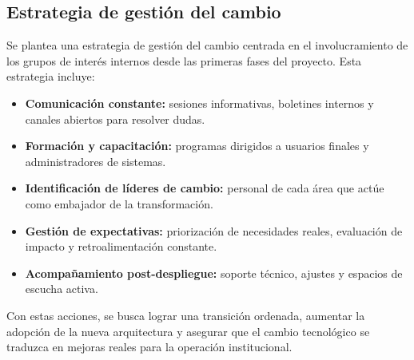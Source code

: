 \vspace{1em}

\subsection{Estrategia de gestión del cambio}

Se plantea una estrategia de gestión del cambio centrada en el involucramiento de los grupos de interés internos desde las primeras fases del proyecto. Esta estrategia incluye:

\begin{itemize}
    \item \textbf{Comunicación constante:} sesiones informativas, boletines internos y canales abiertos para resolver dudas.
    \item \textbf{Formación y capacitación:} programas dirigidos a usuarios finales y administradores de sistemas.
    \item \textbf{Identificación de líderes de cambio:} personal de cada área que actúe como embajador de la transformación.
    \item \textbf{Gestión de expectativas:} priorización de necesidades reales, evaluación de impacto y retroalimentación constante.
    \item \textbf{Acompañamiento post-despliegue:} soporte técnico, ajustes y espacios de escucha activa.
\end{itemize}

Con estas acciones, se busca lograr una transición ordenada, aumentar la adopción de la nueva arquitectura y asegurar que el cambio tecnológico se traduzca en mejoras reales para la operación institucional.
